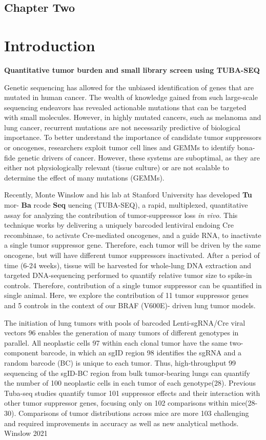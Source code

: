 \hypertarget{chapter-two}{%
\subsection{Chapter Two}\label{chapter-two}}

\hypertarget{introduction}{%
\section{Introduction}\label{introduction}}

\textbf{Quantitative tumor burden and small library screen using TUBA-SEQ}

Genetic sequencing has allowed for the unbiased identification of genes that are mutated in human cancer. The wealth of knowledge gained from such large-scale sequencing endeavors has revealed actionable mutations that can be targeted with small molecules. However, in highly mutated cancers, such as melanoma and lung cancer, recurrent mutations are not necessarily predictive of biological importance. To better understand the importance of candidate tumor suppressors or oncogenes, researchers exploit tumor cell lines and GEMMs to identify bona-fide genetic drivers of cancer. However, these systems are suboptimal, as they are either not physiologically relevant (tissue culture) or are not scalable to determine the effect of many mutations (GEMMs).

Recently, Monte Winslow and his lab at Stanford University has developed \textbf{Tu} mor- \textbf{Ba} rcode \textbf{Seq} uencing (TUBA-SEQ), a rapid, multiplexed, quantitative assay for analyzing the contribution of tumor-suppressor loss \emph{in vivo}. This technique works by delivering a uniquely barcoded lentiviral endoing Cre recombinase, to activate Cre-mediated oncogenes, and a guide RNA, to inactivate a single tumor suppressor gene. Therefore, each tumor will be driven by the same oncogene, but will have different tumor suppressors inactivated. After a period of time (6-24 weeks), tissue will be harvested for whole-lung DNA extraction and targeted DNA-sequencing performed to quantify relative tumor size to spike-in controls. Therefore, contribution of a single tumor suppressor can be quantified in single animal. Here, we explore the contribution of 11 tumor suppressor genes and 5 controls in the context of our BRAF (V600E)- driven lung tumor models.

The initiation of lung tumors with pools of barcoded Lenti-sgRNA/Cre viral vectors 96 enables the generation of many tumors of different genotypes in parallel. All neoplastic cells 97 within each clonal tumor have the same two-component barcode, in which an sgID region 98 identifies the sgRNA and a random barcode (BC) is unique to each tumor. Thus, high-throughput 99 sequencing of the sgID-BC region from bulk tumor-bearing lungs can quantify the number of 100 neoplastic cells in each tumor of each genotype(28). Previous Tuba-seq studies quantify tumor 101 suppressor effects and their interaction with other tumor suppressor genes, focusing only on 102 comparisons within mice(28-30). Comparisons of tumor distributions across mice are more 103 challenging and required improvements in accuracy as well as new analytical methods. Winslow 2021

